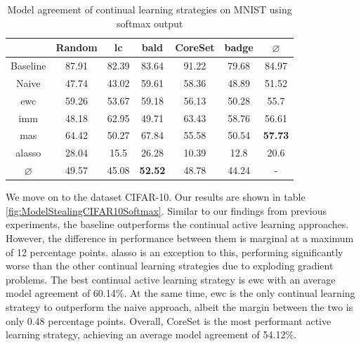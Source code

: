 \begin{table}[h]
    \centering
    \begin{tabular}{ c | c c c c c | c } 
         & Random & \gls{lc} & \gls{bald} & CoreSet & \gls{badge} & $\varnothing$\\ 
        \hline
        Baseline & 87.91 & 82.39 & 83.64 & 91.22 & 79.68 & 84.97\\
        \hline
        Naive & 47.74 & 43.02 & 59.61 & 58.36 & 48.89 & 51.52\\
        \gls{ewc} &  59.26 & 53.67 & 59.18 & 56.13 & 50.28 & 55.7\\
        \gls{imm} & 48.18 & 62.95 & 49.71 & 63.43 & 58.76 & 56.61 \\
        \gls{mas} &  64.42 & 50.27 & 67.84 & 55.58 & 50.54 & \textbf{57.73}\\
        \gls{alasso} & 28.04 & 15.5 & 26.28 & 10.39 & 12.8 & 20.6\\
        \hline
        $\varnothing$ & 49.57 & 45.08 & \textbf{52.52} & 48.78 & 44.24 & -\\
    \end{tabular}
    \caption{Model agreement of continual learning strategies on MNIST using softmax output}
    \label{fig:ModelStealingMNISTSoftmax}
\end{table}


We move on to the dataset CIFAR-10. Our results are shown in table \ref{fig:ModelStealingCIFAR10Softmax}. Similar to our findings from previous experiments, the baseline outperforms 
the continual active learning approaches. However, the difference in performance between them is marginal at a maximum of 12 percentage points.
\gls{alasso} is an exception to this, performing significantly worse than the other continual learning strategies due to exploding gradient problems. The best continual active
learning strategy is \gls{ewc} with an average model agreement of 60.14\%. At the same time, \gls{ewc} is the only continual learning strategy to outperform the naive approach,
albeit the margin between the two is only 0.48 percentage points. Overall, CoreSet is the most performant active learning strategy, achieving an average model agreement of 54.12\%. \par

